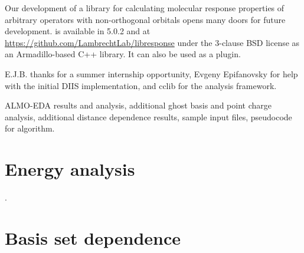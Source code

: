 Our development of a library for calculating molecular response properties of arbitrary operators with non-orthogonal orbitals opens many doors for future development. \libresponse{} is available in \qchem{} 5.0.2 and at \url{https://github.com/LambrechtLab/libresponse} under the 3-clause BSD license as an Armadillo-based\cite{armadillo} C++ library. It can also be used as a \psif{}\cite{Parrish_2017_3185} plugin.

E.J.B. thanks \qchem{} for a summer internship opportunity, Evgeny Epifanovsky for help with the initial DIIS implementation, and cclib\cite{OBoyle:2008cc,eric_berquist_2016_60670} for the analysis framework.

ALMO-EDA results and analysis, additional ghost basis and point charge analysis, additional distance dependence results, sample input files, pseudocode for algorithm.

\section{Energy analysis}

\begin{table}
  
  \caption[ALMO-EDA results for argon\textemdash{}lithium cation dimer]{ALMO-EDA results. Energy units are \si{\kcal\per\mol}. All calculations used Hartree-Fock with a bond length of \SI{2.4297}{\angstrom}.}
  \label{tab:almo-eda-results}
\end{table}

\begin{table}
  
  \caption{Analysis of ALMO-EDA terms from table~\ref{tab:almo-eda-results}.}.
  \label{tab:almo-eda-results-percentages}
\end{table}

\section{Basis set dependence}

\begin{table}
  
  \caption[Point charge and ghost function polarizability analysis]{Percentage of supermolecular result for point charge and ghost function polarizabilities. All calculations used Hartree-Fock with canonical MOs and a distance of \SI{2.4297}{\angstrom} from argon to the other center(s).}
  \label{tab:basis-set-dependence-percentages}
\end{table}

